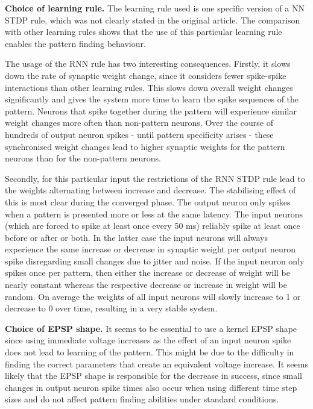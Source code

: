 \documentclass[10pt,a4paper,onecolumn]{article}
\begin{document}
\textbf{Choice of learning rule.} The learning rule used is one specific
version of a NN STDP rule, which was not clearly stated in the original
article. The comparison with other learning rules shows that the use of
this particular learning rule enables the pattern finding behaviour.

The usage of the RNN rule has two interesting consequences. Firstly, it
slows down the rate of synaptic weight change, since it considers fewer
spike-spike interactions than other learning rules. This slows down
overall weight changes significantly and gives the system more time to
learn the spike sequences of the pattern. Neurons that spike together
during the pattern will experience similar weight changes more often
than non-pattern neurons. Over the course of hundreds of output neuron
spikes - until pattern specificity arises - these synchronised weight
changes lead to higher synaptic weights for the pattern neurons than for
the non-pattern neurons.

Secondly, for this particular input the restrictions of the RNN STDP
rule lead to the weights alternating between increase and decrease. The
stabilising effect of this is most clear during the converged phase. The
output neuron only spikes when a pattern is presented more or less at
the same latency. The input neurons (which are forced to spike at least
once every 50 ms) reliably spike at least once before or after or both.
In the latter case the input neurons will always experience the same
increase or decrease in synaptic weight per output neuron spike
disregarding small changes due to jitter and noise. If the input neuron
only spikes once per pattern, then either the increase or decrease of
weight will be nearly constant whereas the respective decrease or
increase in weight will be random. On average the weights of all input
neurons will slowly increase to 1 or decrease to 0 over time, resulting
in a very stable system.

\textbf{Choice of EPSP shape.} It seems to be essential to use a kernel
EPSP shape since using immediate voltage increases as the effect of an
input neuron spike does not lead to learning of the pattern. This might
be due to the difficulty in finding the correct parameters that create
an equivalent voltage increase. It seems likely that the EPSP shape is
responsible for the decrease in success, since small changes in output
neuron spike times also occur when using different time step sizes and
do not affect pattern finding abilities under standard conditions.

{\sffamily \small
  \printbibliography[title=References]
}
\end{document}
